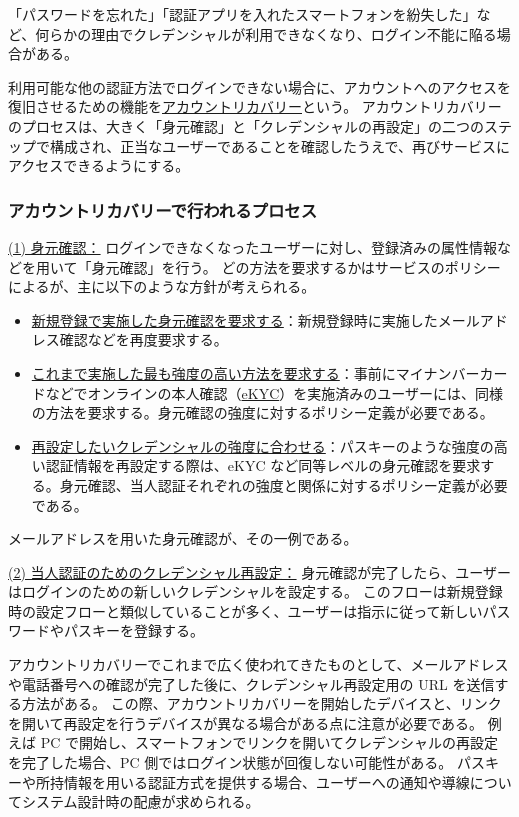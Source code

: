 \documentclass[uplatex]{jsarticle}
\def\label#1{}%
\begin{document}
\begin{exa}[ログイン不能に陥る場合]\label{exa:ch3-login-failure}
「パスワードを忘れた」「認証アプリを入れたスマートフォンを紛失した」など、何らかの理由でクレデンシャルが利用できなくなり、ログイン不能に陥る場合がある。
\end{exa}

\begin{dfn}[アカウントリカバリー]\label{dfn:account-recovery}
利用可能な他の認証方法でログインできない場合に、アカウントへのアクセスを復旧させるための機能を\underline{アカウントリカバリー}という。
アカウントリカバリーのプロセスは、大きく「身元確認」と「クレデンシャルの再設定」の二つのステップで構成され、正当なユーザーであることを確認したうえで、再びサービスにアクセスできるようにする。
\end{dfn}

\subsubsection{アカウントリカバリーで行われるプロセス}

\underline{(1) 身元確認：}
ログインできなくなったユーザーに対し、登録済みの属性情報などを用いて「身元確認」を行う。
どの方法を要求するかはサービスのポリシーによるが、主に以下のような方針が考えられる。
\begin{itemize}
\item \underline{新規登録で実施した身元確認を要求する}：新規登録時に実施したメールアドレス確認などを再度要求する。
\item \underline{これまで実施した最も強度の高い方法を要求する}：事前にマイナンバーカードなどでオンラインの本人確認（\underline{eKYC}）を実施済みのユーザーには、同様の方法を要求する。身元確認の強度に対するポリシー定義が必要である。
\item \underline{再設定したいクレデンシャルの強度に合わせる}：パスキーのような強度の高い認証情報を再設定する際は、eKYC など同等レベルの身元確認を要求する。身元確認、当人認証それぞれの強度と関係に対するポリシー定義が必要である。
\end{itemize}
メールアドレスを用いた身元確認が、その一例である。

\underline{(2) 当人認証のためのクレデンシャル再設定：}
身元確認が完了したら、ユーザーはログインのための新しいクレデンシャルを設定する。
このフローは新規登録時の設定フローと類似していることが多く、ユーザーは指示に従って新しいパスワードやパスキーを登録する。

\begin{rem}[クレデンシャル再設定の環境についての留意事項]\label{rem:ch3-reset-device}
アカウントリカバリーでこれまで広く使われてきたものとして、メールアドレスや電話番号への確認が完了した後に、クレデンシャル再設定用の URL を送信する方法がある。
この際、アカウントリカバリーを開始したデバイスと、リンクを開いて再設定を行うデバイスが異なる場合がある点に注意が必要である。
例えば PC で開始し、スマートフォンでリンクを開いてクレデンシャルの再設定を完了した場合、PC 側ではログイン状態が回復しない可能性がある。
パスキーや所持情報を用いる認証方式を提供する場合、ユーザーへの通知や導線についてシステム設計時の配慮が求められる。
\end{rem}
\end{document}
